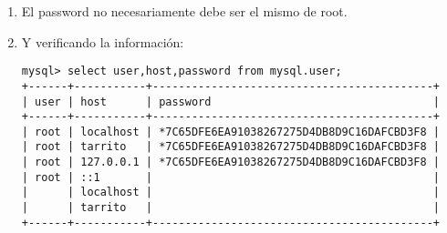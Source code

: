 \begin{enumerate}
\begin{enumerate}
 \item El password no necesariamente debe ser el mismo de root.
\item Y verificando la información:
   \begin{center}
   \begin{verbatim}
mysql> select user,host,password from mysql.user;
+------+-----------+-------------------------------------------+
| user | host      | password                                  |
+------+-----------+-------------------------------------------+
| root | localhost | *7C65DFE6EA91038267275D4DB8D9C16DAFCBD3F8 |
| root | tarrito   | *7C65DFE6EA91038267275D4DB8D9C16DAFCBD3F8 |
| root | 127.0.0.1 | *7C65DFE6EA91038267275D4DB8D9C16DAFCBD3F8 |
| root | ::1       |                                           |
|      | localhost |                                           |
|      | tarrito   |                                           |
+------+-----------+-------------------------------------------+
   \end{verbatim}
   \end{center}

 \end{enumerate}

 
\end{enumerate}

\newpage